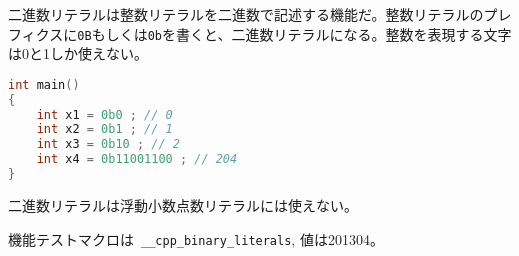 %

二進数リテラルは整数リテラルを二進数で記述する機能だ。整数リテラルのプレフィクスに\lstinline!0B!もしくは\lstinline!0b!を書くと、二進数リテラルになる。整数を表現する文字は0と1しか使えない。

\begin{lstlisting}[language=C++]
int main()
{
    int x1 = 0b0 ; // 0
    int x2 = 0b1 ; // 1
    int x3 = 0b10 ; // 2
    int x4 = 0b11001100 ; // 204
}
\end{lstlisting}

二進数リテラルは浮動小数点数リテラルには使えない。

機能テストマクロは~\lstinline!__cpp_binary_literals!, 値は201304。
